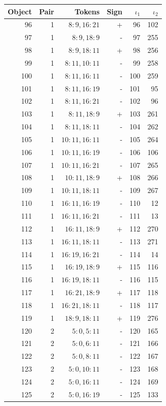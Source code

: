 \begin{center}\begin{tabular}{rrrrrr}\toprule Object & Pair & Tokens & Sign & $\iota_1$ & $\iota_2$\\\midrule
96 & 1 & $8:9,16:21$ & + & 96 & 102\\
97 & 1 & $8:9,18:9$ & - & 97 & 255\\
98 & 1 & $8:9,18:11$ & + & 98 & 256\\
99 & 1 & $8:11,10:11$ & - & 99 & 258\\
100 & 1 & $8:11,16:11$ & - & 100 & 259\\
101 & 1 & $8:11,16:19$ & - & 101 & 95\\
102 & 1 & $8:11,16:21$ & - & 102 & 96\\
103 & 1 & $8:11,18:9$ & + & 103 & 261\\
104 & 1 & $8:11,18:11$ & - & 104 & 262\\
105 & 1 & $10:11,16:11$ & - & 105 & 264\\
106 & 1 & $10:11,16:19$ & - & 106 & 106\\
107 & 1 & $10:11,16:21$ & - & 107 & 265\\
108 & 1 & $10:11,18:9$ & + & 108 & 266\\
109 & 1 & $10:11,18:11$ & - & 109 & 267\\
110 & 1 & $16:11,16:19$ & - & 110 & 12\\
111 & 1 & $16:11,16:21$ & - & 111 & 13\\
112 & 1 & $16:11,18:9$ & + & 112 & 270\\
113 & 1 & $16:11,18:11$ & - & 113 & 271\\
114 & 1 & $16:19,16:21$ & - & 114 & 14\\
115 & 1 & $16:19,18:9$ & + & 115 & 116\\
116 & 1 & $16:19,18:11$ & - & 116 & 115\\
117 & 1 & $16:21,18:9$ & + & 117 & 118\\
118 & 1 & $16:21,18:11$ & - & 118 & 117\\
119 & 1 & $18:9,18:11$ & + & 119 & 276\\
120 & 2 & $5:0,5:11$ & - & 120 & 165\\
121 & 2 & $5:0,6:11$ & - & 121 & 166\\
122 & 2 & $5:0,8:11$ & - & 122 & 167\\
123 & 2 & $5:0,10:11$ & - & 123 & 168\\
124 & 2 & $5:0,16:11$ & - & 124 & 169\\
125 & 2 & $5:0,16:19$ & - & 125 & 133\\

\end{tabular}
\end{center}
